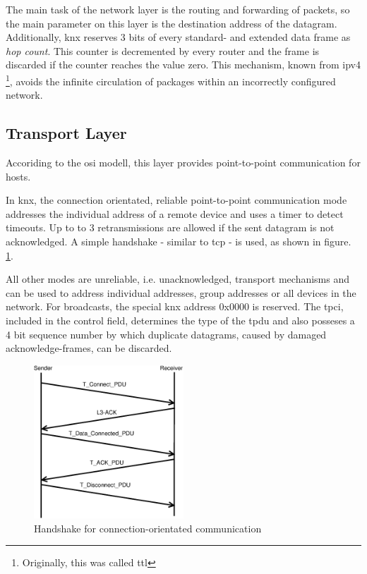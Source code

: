 The main task of the network layer is the routing and forwarding of packets, so the main parameter on this layer is the destination address of the
datagram. Additionally, \gls{knx} reserves 3 bits of every standard- and extended data frame as
\textit{hop count}. This counter is decremented by every router and the frame is discarded if the counter reaches the value zero. This mechanism, known from
\gls{ipv4} \cite{rfc791} \footnote{Originally, this was called \gls{ttl}}, avoids the infinite circulation of packages within an incorrectly configured network.

\subsection{Transport Layer}

Accoriding to the \gls{osi} modell, this layer provides point-to-point communication for hosts.

In \gls{knx}, the connection orientated, reliable point-to-point communication mode addresses the individual address of a remote device and uses a timer to detect timeouts.
Up to to 3 retransmissions are allowed if the sent datagram is not acknowledged. A simple handshake - similar to \gls{tcp} - is used, as shown in figure. 
\ref{fig:handshake}.

All other modes are unreliable, i.e. unacknowledged, transport mechanisms and can be used to address individual addresses, group addresses or all devices in the
network. For broadcasts, the special \gls{knx} address 0x0000 is reserved. 
The \gls{tpci}, included in the control field, determines the type of the \gls{tpdu} and also posseses a 4 bit sequence number by which duplicate datagrams, caused by damaged 
acknowledge-frames, can be discarded.

 \begin{figure}
    \centering
    \includegraphics[width=0.5\textwidth]{figures/TransportHandshake.eps}
    \caption{Handshake for connection-orientated communication}
    \label{fig:handshake}
\end{figure}
 
